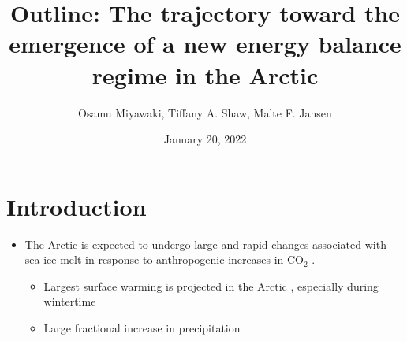 \documentclass{article}
\title{Outline: The trajectory toward the emergence of a new energy balance regime in the Arctic}
\date{January 20, 2022}
\author{Osamu Miyawaki, Tiffany A. Shaw, Malte F. Jansen}
\begin{document}
\maketitle

\section*{Introduction}
\begin{itemize}
    \item The Arctic is expected to undergo large and rapid changes associated with sea ice melt in response to anthropogenic increases in CO$_2$ \citep{dai2019, feldl2020}.
    \begin{itemize}
        \item Largest surface warming is projected in the Arctic \citep[Arctic Amplification, e.g.][]{manabe1975, held1993a}, especially during wintertime \citep{lu2009}
        \item Large fractional increase in precipitation \citep{bintanja2014,siler2018,pithan2021}
    \end{itemize}


\end{itemize}
\end{document}
